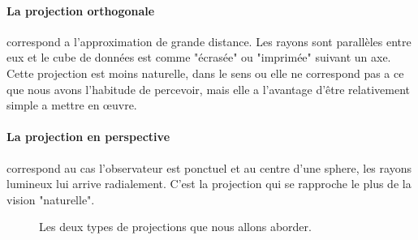 \paragraph{La projection orthogonale} correspond a l'approximation de grande distance.
Les rayons sont parallèles entre eux et le cube de données est comme "écrasée" ou "imprimée" suivant un axe.
Cette projection est moins naturelle, dans le sens ou elle ne correspond pas a ce que nous avons l'habitude de percevoir, mais elle a l'avantage d'être relativement simple a mettre en œuvre.

\paragraph{La projection en perspective} correspond au cas l'observateur est ponctuel et au centre d'une sphere, les rayons lumineux lui arrive radialement.
C'est la projection qui se rapproche le plus de la vision "naturelle".

\begin{figure}[bth]
    \center
    \qquad
    \caption{Les deux types de projections que nous allons aborder.}
 	\label{fig:raycast_projection}
\end{figure}



